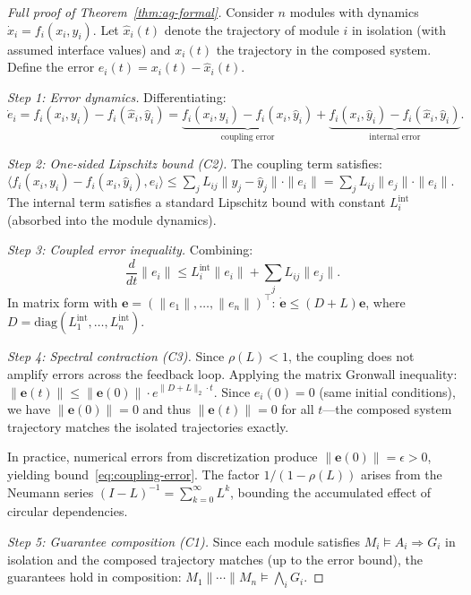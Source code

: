 \documentclass[11pt]{article}
\begin{document}
\begin{proof}[Full proof of Theorem~\ref{thm:ag-formal}]
Consider $n$ modules with dynamics $\dot{x}_i = f_i(x_i, y_i)$.
Let $\hat{x}_i(t)$ denote the trajectory of module $i$ in isolation
(with assumed interface values) and $x_i(t)$ the trajectory in the
composed system. Define the error $e_i(t) = x_i(t) - \hat{x}_i(t)$.

\emph{Step 1: Error dynamics.} Differentiating:
\begin{equation}
\dot{e}_i = f_i(x_i, y_i) - f_i(\hat{x}_i, \hat{y}_i)
= \underbrace{f_i(x_i, y_i) - f_i(x_i, \hat{y}_i)}_{\text{coupling error}}
+ \underbrace{f_i(x_i, \hat{y}_i) - f_i(\hat{x}_i, \hat{y}_i)}_{\text{internal error}}.
\end{equation}

\emph{Step 2: One-sided Lipschitz bound (C2).} The coupling term
satisfies:
$\langle f_i(x_i, y_i) - f_i(x_i, \hat{y}_i), e_i \rangle
\leq \sum_j L_{ij} \|y_j - \hat{y}_j\| \cdot \|e_i\|
= \sum_j L_{ij} \|e_j\| \cdot \|e_i\|$.
The internal term satisfies a standard Lipschitz bound with constant
$L_i^{\text{int}}$ (absorbed into the module dynamics).

\emph{Step 3: Coupled error inequality.} Combining:
\begin{equation}
\frac{d}{dt}\|e_i\| \leq L_i^{\text{int}} \|e_i\| + \sum_j L_{ij} \|e_j\|.
\end{equation}
In matrix form with $\mathbf{e} = (\|e_1\|, \ldots, \|e_n\|)^\top$:
$\dot{\mathbf{e}} \leq (D + L)\mathbf{e}$,
where $D = \text{diag}(L_1^{\text{int}}, \ldots, L_n^{\text{int}})$.

\emph{Step 4: Spectral contraction (C3).} Since $\rho(L) < 1$,
the coupling does not amplify errors across the feedback loop.
Applying the matrix Gronwall inequality:
$\|\mathbf{e}(t)\| \leq \|\mathbf{e}(0)\| \cdot
e^{\|D + L\|_2 \cdot t}$.
Since $e_i(0) = 0$ (same initial conditions), we have
$\|\mathbf{e}(0)\| = 0$ and thus $\|\mathbf{e}(t)\| = 0$ for all
$t$---the composed system trajectory matches the isolated trajectories
exactly.

In practice, numerical errors from discretization produce
$\|\mathbf{e}(0)\| = \epsilon > 0$, yielding
bound~\eqref{eq:coupling-error}. The factor $1/(1-\rho(L))$ arises
from the Neumann series $(I - L)^{-1} = \sum_{k=0}^\infty L^k$,
bounding the accumulated effect of circular dependencies.

\emph{Step 5: Guarantee composition (C1).} Since each module
satisfies $M_i \models A_i \Rightarrow G_i$ in isolation and the
composed trajectory matches (up to the error bound), the guarantees
hold in composition: $M_1 \| \cdots \| M_n \models \bigwedge_i G_i$.
\end{proof}
\end{document}

